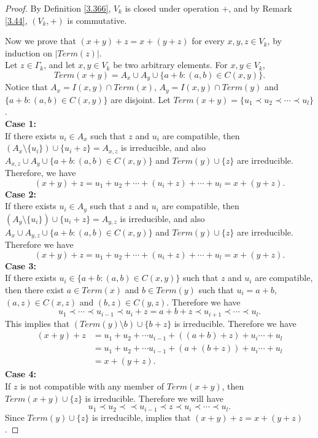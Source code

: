 \documentclass[twoside,11pt]{article}
\begin{document}
\begin{proof}
	By Definition \ref{3.366}, $V_k$ is closed under operation $+$, and by Remark \ref{3.44}, $(V_k,+)$ is commutative.
	
	Now we prove that $(x+y)+z=x+(y+z)$ for every $x,y,z\in V_k$, by induction on $|Term(z)|$.\\
	Let $z\in \Gamma_k$, and let $x,y\in V_k$ be two arbitrary elements. For $x,y\in V_k$, 
	\[
	Term(x+y)=A_x\cup A_y\cup\{a+b:(a,b)\in C(x,y)\}.
	\]
	Notice that $A_x=I(x,y)\cap Term(x)$, $A_y=I(x,y)\cap Term(y)$ and $\{a+b:(a,b)\in C(x,y)\}$ are disjoint. Let $Term(x+y)=\{u_1\prec u_2\prec\cdots\prec u_l\}$.\\
	{\bf{ Case 1:}}\\
	If there exists $u_i\in A_x$ such that $z$ and $u_i$ are compatible, then $(A_x\setminus\{u_i\})\cup\{u_i+z\}=A_{x,z}$ is irreducible, and also  $A_{x,z}\cup A_y\cup\{a+b:(a,b)\in C(x,y)\}$  and $Term(y)\cup\{z\}$  are irreducible. Therefore, we have 
	\[
	(x+y)+z=u_1+u_2+\cdots+(u_i+z)+\cdots+u_l=x+(y+z).
	\]
	{\bf{ Case 2:}}\\	
	If there exists $u_i\in A_y$ such that $z$ and $u_i$ are compatible, then $(A_y\setminus\{u_i\})\cup\{u_i+z\}=A_{y,z}$ is irreducible, and also  $A_{x}\cup A_{y,z}\cup\{a+b:(a,b)\in C(x,y)\}$  and $Term(y)\cup\{z\}$  are irreducible. Therefore we have 
	\[
	(x+y)+z=u_1+u_2+\cdots+(u_i+z)+\cdots+u_l=x+(y+z).
	\]
	{\bf{ Case 3:}}\\	
	If there exists $u_i\in \{a+b:(a,b)\in C(x,y)\}$ such that $z$ and $u_i$ are compatible, then there exist $a\in Term(x)$ and $b\in Term(y)$ such that $u_i=a+b$, $(a,z)\in C(x,z)$ and $(b,z)\in C(y,z)$.  Therefore we have 
	\[
	u_1\prec\cdots\prec u_{i-1}\prec u_i+z=a+b+z\prec u_{i+1}\prec \cdots\prec u_l.
	\]
	This implies that $(Term(y)\setminus{b})\cup\{b+z\}$ is irreducible. Therefore we have 
	\begin{align*}
	(x+y)+z&=u_1+u_2+\cdots u_{i-1}+((a+b)+z)+u_{i}\cdots+u_l\\
	&=u_1+u_2+\cdots u_{i-1}+(a+(b+z))+u_{i}\cdots+u_l\\
	&=x+(y+z).
	\end{align*}	
	{\bf{ Case 4:}}\\	
	If $z$ is not compatible with any member of $Term(x+y)$, then $Term(x+y)\cup\{z\}$ is irreducible. Therefore we will have
	\[
	u_1\prec u_2\prec\prec u_{i-1}\prec z\prec u_i\prec\cdots\prec u_l.
	\]
	Since $Term(y)\cup\{z\}$ is irreducible, implies that $(x+y)+z=x+(y+z)$.
	

\end{proof}
\end{document}
